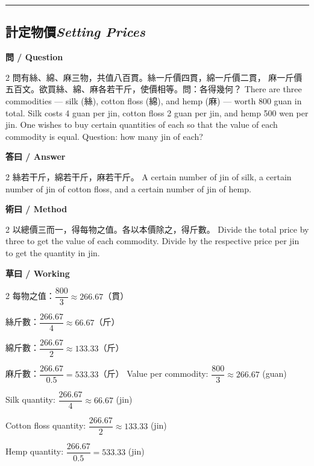 \documentclass[11pt,a4paper]{article}
\newcommand{\bilingualsubsection}[2]{\subsection{#1\quad\textit{#2}}}
\newcommand{\longline}{\noindent\rule{\textwidth}{0.4pt}}
\begin{document}
\vspace{0.5em}
\longline

\bilingualsubsection{計定物價}{Setting Prices}

\vspace{0.4em}
\noindent\textbf{\textcolor{chinesecolor}{問} / \textcolor{englishcolor}{Question}}
\vspace{0.3em}
\begin{paracol}{2}
問有絲、綿、麻三物，共值八百貫。絲一斤價四貫，綿一斤價二貫，
麻一斤價五百文。欲買絲、綿、麻各若干斤，使價相等。問：各得幾何？
\switchcolumn
There are three commodities --- silk (絲), cotton floss (綿), and hemp (麻)
--- worth 800 guan in total. Silk costs 4 guan per jin, cotton floss 2 guan
per jin, and hemp 500 wen per jin. One wishes to buy certain quantities of
each so that the value of each commodity is equal. Question: how many jin of
each?
\end{paracol}

\vspace{0.4em}
\noindent\textbf{\textcolor{chinesecolor}{答曰} / \textcolor{englishcolor}{Answer}}
\vspace{0.2em}
\begin{paracol}{2}
絲若干斤，綿若干斤，麻若干斤。
\switchcolumn
A certain number of jin of silk, a certain number of jin of cotton floss,
and a certain number of jin of hemp.
\end{paracol}

\vspace{0.4em}
\noindent\textbf{\textcolor{chinesecolor}{術曰} / \textcolor{englishcolor}{Method}}
\vspace{0.2em}
\begin{paracol}{2}
以總價三而一，得每物之值。各以本價除之，得斤數。
\switchcolumn
Divide the total price by three to get the value of each commodity. Divide
by the respective price per jin to get the quantity in jin.
\end{paracol}

\vspace{0.4em}
\noindent\textbf{\textcolor{chinesecolor}{草曰} / \textcolor{englishcolor}{Working}}
\vspace{0.2em}
\begin{paracol}{2}
每物之值：$\dfrac{800}{3} \approx 266.67$（貫）

絲斤數：$\dfrac{266.67}{4} \approx 66.67$（斤）

綿斤數：$\dfrac{266.67}{2} \approx 133.33$（斤）

麻斤數：$\dfrac{266.67}{0.5} = 533.33$（斤）
\switchcolumn
Value per commodity: $\dfrac{800}{3} \approx 266.67$ (guan)

Silk quantity: $\dfrac{266.67}{4} \approx 66.67$ (jin)

Cotton floss quantity: $\dfrac{266.67}{2} \approx 133.33$ (jin)

Hemp quantity: $\dfrac{266.67}{0.5} = 533.33$ (jin)
\end{paracol}
\end{document}

